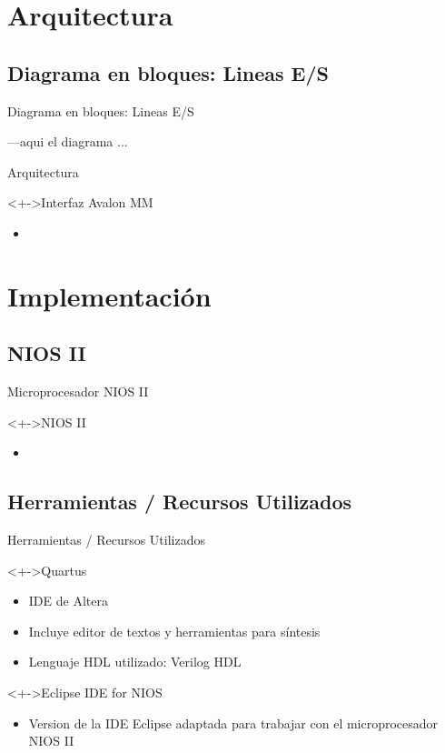 \documentclass[xcolor=dvipsnames]{beamer}
\begin{document}
\section{Arquitectura}
\subsection{Diagrama en bloques: Lineas E/S}
\begin{frame}{Diagrama en bloques: Lineas E/S}

---aqui el diagrama ...

\end{frame}

\begin{frame}{Arquitectura}
  \begin{block}<+->{Interfaz Avalon MM}   
    \begin{itemize}
      \scriptsize
     	\item
    \end{itemize}
  \end{block}
\end{frame}

\section{Implementación}
\subsection{NIOS II}
\begin{frame}{Microprocesador NIOS II}
  \begin{block}<+->{NIOS II}   
    \begin{itemize}
      \scriptsize
     	\item
    \end{itemize}
  \end{block}
\end{frame}

\subsection{Herramientas / Recursos Utilizados}
\begin{frame}{Herramientas / Recursos Utilizados}
\begin{block}<+->{Quartus}   
    \begin{itemize}
      \scriptsize
     	\item IDE de Altera
	\item Incluye editor de textos y herramientas para síntesis
	\item Lenguaje HDL utilizado: Verilog HDL
    \end{itemize} 
  \end{block}
  \begin{block}<+->{Eclipse IDE for NIOS}   
    \begin{itemize}
      \scriptsize
     	\item Version de la IDE Eclipse adaptada para trabajar con el microprocesador NIOS II
    \end{itemize}	
  \end{block}
\end{frame}
\end{document}
